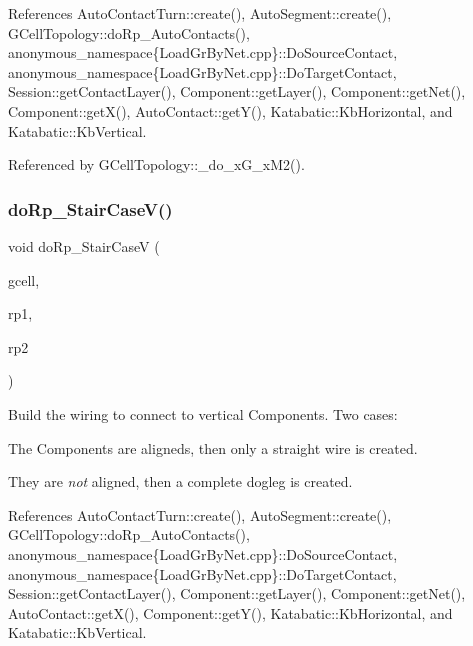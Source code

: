  

References Auto\+Contact\+Turn\+::create(), Auto\+Segment\+::create(), G\+Cell\+Topology\+::do\+Rp\+\_\+\+Auto\+Contacts(), anonymous\+\_\+namespace\{\+Load\+Gr\+By\+Net.\+cpp\}\+::\+Do\+Source\+Contact, anonymous\+\_\+namespace\{\+Load\+Gr\+By\+Net.\+cpp\}\+::\+Do\+Target\+Contact, Session\+::get\+Contact\+Layer(), Component\+::get\+Layer(), Component\+::get\+Net(), Component\+::get\+X(), Auto\+Contact\+::get\+Y(), Katabatic\+::\+Kb\+Horizontal, and Katabatic\+::\+Kb\+Vertical.



Referenced by G\+Cell\+Topology\+::\+\_\+do\+\_\+x\+G\+\_\+x\+M2().

\mbox{\label{group__LoadGlobalRouting_ga6361fb0e90f35cd59063a1ee971ef2a9}} 
\subsubsection{\texorpdfstring{do\+Rp\+\_\+\+Stair\+Case\+V()}{doRp\_StairCaseV()}}
{\footnotesize\ttfamily void do\+Rp\+\_\+\+Stair\+CaseV (\begin{DoxyParamCaption}\item[{\mbox{\hyperlink{classKatabatic_1_1GCell}{G\+Cell}} $\ast$}]{gcell,  }\item[{\textbf{ Component} $\ast$}]{rp1,  }\item[{\textbf{ Component} $\ast$}]{rp2 }\end{DoxyParamCaption})\hspace{0.3cm}{\ttfamily [static]}}

Build the wiring to connect to vertical Components. Two cases\+:
\begin{DoxyItemize}
\item The Components are aligneds, then only a straight wire is created.
\item They are {\itshape not} aligned, then a complete dogleg is created.
\end{DoxyItemize}

 

References Auto\+Contact\+Turn\+::create(), Auto\+Segment\+::create(), G\+Cell\+Topology\+::do\+Rp\+\_\+\+Auto\+Contacts(), anonymous\+\_\+namespace\{\+Load\+Gr\+By\+Net.\+cpp\}\+::\+Do\+Source\+Contact, anonymous\+\_\+namespace\{\+Load\+Gr\+By\+Net.\+cpp\}\+::\+Do\+Target\+Contact, Session\+::get\+Contact\+Layer(), Component\+::get\+Layer(), Component\+::get\+Net(), Auto\+Contact\+::get\+X(), Component\+::get\+Y(), Katabatic\+::\+Kb\+Horizontal, and Katabatic\+::\+Kb\+Vertical.



